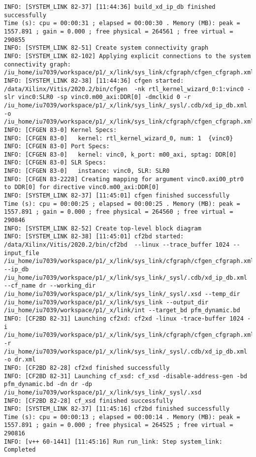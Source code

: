 \begin{lstlisting}[label=lst:lev_rec,caption=Содержимое log-файла]
INFO: [SYSTEM_LINK 82-37] [11:44:36] build_xd_ip_db finished successfully
Time (s): cpu = 00:00:31 ; elapsed = 00:00:30 . Memory (MB): peak = 1557.891 ; gain = 0.000 ; free physical = 264561 ; free virtual = 290855
INFO: [SYSTEM_LINK 82-51] Create system connectivity graph
INFO: [SYSTEM_LINK 82-102] Applying explicit connections to the system connectivity graph: /iu_home/iu7039/workspace/p1/_x/link/sys_link/cfgraph/cfgen_cfgraph.xml
INFO: [SYSTEM_LINK 82-38] [11:44:36] cfgen started: /data/Xilinx/Vitis/2020.2/bin/cfgen  -nk rtl_kernel_wizard_0:1:vinc0 -slr vinc0:SLR0 -sp vinc0.m00_axi:DDR[0] -dmclkid 0 -r /iu_home/iu7039/workspace/p1/_x/link/sys_link/_sysl/.cdb/xd_ip_db.xml -o /iu_home/iu7039/workspace/p1/_x/link/sys_link/cfgraph/cfgen_cfgraph.xml
INFO: [CFGEN 83-0] Kernel Specs: 
INFO: [CFGEN 83-0]   kernel: rtl_kernel_wizard_0, num: 1  {vinc0}
INFO: [CFGEN 83-0] Port Specs: 
INFO: [CFGEN 83-0]   kernel: vinc0, k_port: m00_axi, sptag: DDR[0]
INFO: [CFGEN 83-0] SLR Specs: 
INFO: [CFGEN 83-0]   instance: vinc0, SLR: SLR0
INFO: [CFGEN 83-2228] Creating mapping for argument vinc0.axi00_ptr0 to DDR[0] for directive vinc0.m00_axi:DDR[0]
INFO: [SYSTEM_LINK 82-37] [11:45:01] cfgen finished successfully
Time (s): cpu = 00:00:25 ; elapsed = 00:00:25 . Memory (MB): peak = 1557.891 ; gain = 0.000 ; free physical = 264560 ; free virtual = 290846
INFO: [SYSTEM_LINK 82-52] Create top-level block diagram
INFO: [SYSTEM_LINK 82-38] [11:45:01] cf2bd started: /data/Xilinx/Vitis/2020.2/bin/cf2bd  --linux --trace_buffer 1024 --input_file /iu_home/iu7039/workspace/p1/_x/link/sys_link/cfgraph/cfgen_cfgraph.xml --ip_db /iu_home/iu7039/workspace/p1/_x/link/sys_link/_sysl/.cdb/xd_ip_db.xml --cf_name dr --working_dir /iu_home/iu7039/workspace/p1/_x/link/sys_link/_sysl/.xsd --temp_dir /iu_home/iu7039/workspace/p1/_x/link/sys_link --output_dir /iu_home/iu7039/workspace/p1/_x/link/int --target_bd pfm_dynamic.bd
INFO: [CF2BD 82-31] Launching cf2xd: cf2xd -linux -trace-buffer 1024 -i /iu_home/iu7039/workspace/p1/_x/link/sys_link/cfgraph/cfgen_cfgraph.xml -r /iu_home/iu7039/workspace/p1/_x/link/sys_link/_sysl/.cdb/xd_ip_db.xml -o dr.xml
INFO: [CF2BD 82-28] cf2xd finished successfully
INFO: [CF2BD 82-31] Launching cf_xsd: cf_xsd -disable-address-gen -bd pfm_dynamic.bd -dn dr -dp /iu_home/iu7039/workspace/p1/_x/link/sys_link/_sysl/.xsd
INFO: [CF2BD 82-28] cf_xsd finished successfully
INFO: [SYSTEM_LINK 82-37] [11:45:16] cf2bd finished successfully
Time (s): cpu = 00:00:13 ; elapsed = 00:00:14 . Memory (MB): peak = 1557.891 ; gain = 0.000 ; free physical = 264525 ; free virtual = 290816
INFO: [v++ 60-1441] [11:45:16] Run run_link: Step system_link: Completed

\end{lstlisting}
